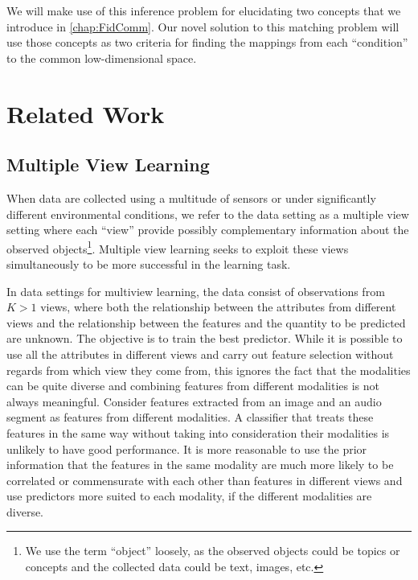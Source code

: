 \documentclass[12pt,oneside,final]{thesis}\usepackage[]{graphicx}\usepackage[]{color}
\begin{document}
We will make use of this inference problem for elucidating two concepts that we introduce  in \ref{chap:FidComm}. Our novel solution to this matching problem will use those concepts as two criteria for finding the mappings from each ``condition'' to the common low-dimensional space.




\chapter{Related Work}
\label{chap:RelatedWork}



\section{Multiple View Learning}
\label{sec:MultiViewLearn}
When data are collected using a multitude of sensors or under significantly different environmental conditions, we refer to  the data setting as a multiple view setting where each ``view'' provide possibly complementary  information about the observed objects\footnote{We use the term ``object''  loosely, as the observed objects could be topics or concepts and the  collected data could be text, images, etc.}. Multiple view learning seeks to exploit these views simultaneously to be more successful in the learning task.

In data settings for multiview learning, the data consist of observations from $K>1$ views, where both the relationship between the attributes from different views and the relationship between the features and the quantity to be predicted are unknown. The objective is to train the best predictor. While it is possible to use all the attributes in different views and carry out feature selection without regards from which view they come from, this ignores the fact that the modalities can be quite diverse and combining features from different modalities is not always meaningful. Consider features extracted from an image  and an audio segment as features from different modalities. A classifier that treats these features in the same way without taking into consideration their modalities is  unlikely to have good performance.
It is more reasonable to use the prior information that the features in the same modality are much more likely to be correlated or commensurate with each other than features in different views and use predictors more suited to each modality, if the different modalities are diverse.
\end{document}
